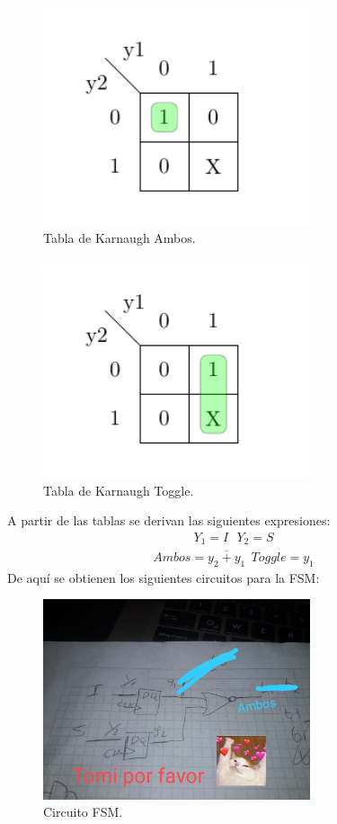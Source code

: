  \begin{figure}[H]
	\centering
	\includegraphics[width=0.7\textwidth]{ImagenesEjercicio1/Mapa3.pdf}
	\caption{Tabla de Karnaugh Ambos.}
	\label{fig:fsm}
\end{figure}
 \begin{figure}[H]
	\centering
	\includegraphics[width=0.7\textwidth]{ImagenesEjercicio1/Mapa4.pdf}
	\caption{Tabla de Karnaugh Toggle.}
	\label{fig:fsm}
\end{figure}
A partir de las tablas se derivan las siguientes expresiones:
\begin{align}
	Y_1 = I \ \ \ Y_2=S 
\end{align}
\begin{align}
Ambos= \overline{y_2+y_1} \ \ Toggle= y_1
\end{align}
De aquí se obtienen los siguientes circuitos para la FSM:
 \begin{figure}[H]
	\centering
	\includegraphics[width=0.7\textwidth]{ImagenesEjercicio1/fsm.jpeg}
	\caption{Circuito FSM.}
	\label{fig:fsm}
\end{figure}
